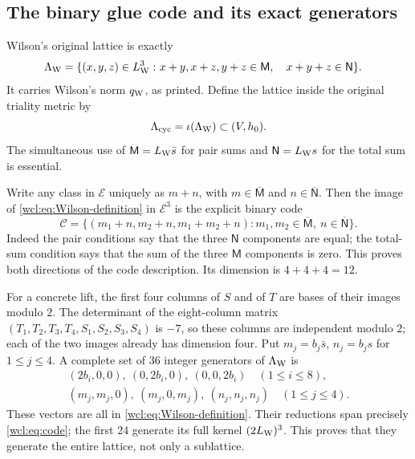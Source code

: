 \subsection{The binary glue code and its exact generators}

Wilson's original lattice is exactly
\begin{equation}
\begin{split}
 \Lambda_{\rm W}=\{(x,y,z)\in L_{\rm W}^3:\ &
 x+y,x+z,y+z\in\mathsf M,\quad x+y+z\in\mathsf N\}.
\end{split}
 \label{wcl:eq:Wilson-definition}
\end{equation}
It carries Wilson's norm $q_{\rm W}$, as printed. Define the lattice
inside the original triality metric by
\[
 \Lambda_{\rm cyc}=\iota(\Lambda_{\rm W})\subset(V,h_0).
\]
The simultaneous use of $\mathsf M=L_{\rm W}\bar s$ for pair sums
and $\mathsf N=L_{\rm W}s$ for the total sum is essential.

Write any class in $\mathcal E$ uniquely as $m+n$, with
$m\in\overline{\mathsf M}$ and $n\in\overline{\mathsf N}$.
Then the image of \eqref{wcl:eq:Wilson-definition} in $\mathcal E^3$
is the explicit binary code
\begin{equation}
 \mathcal C=
 \{(m_1+n,m_2+n,m_1+m_2+n):
       m_1,m_2\in\overline{\mathsf M},\
       n\in\overline{\mathsf N}\}.
 \label{wcl:eq:code}
\end{equation}
Indeed the pair conditions say that the three $\mathsf N$ components
are equal; the total-sum condition says that the sum of the three
$\mathsf M$ components is zero. This proves both directions of the
code description. Its dimension is $4+4+4=12$.

For a concrete lift, the first four columns of $S$ and of $T$ are
bases of their images modulo $2$. The determinant of the eight-column
matrix $(T_1,T_2,T_3,T_4,S_1,S_2,S_3,S_4)$ is $-7$, so these columns
are independent modulo $2$; each of the two images already has
dimension four. Put $m_j=b_j\bar s$, $n_j=b_js$ for $1\le j\le4$.
A complete set of $36$ integer generators of $\Lambda_{\rm W}$ is
\begin{equation}
\begin{gathered}
 (2b_i,0,0),\ (0,2b_i,0),\ (0,0,2b_i)\quad(1\le i\le8),\\
 (m_j,m_j,0),\ (m_j,0,m_j),\ (n_j,n_j,n_j)\quad(1\le j\le4).
\end{gathered}
 \label{wcl:eq:generators}
\end{equation}
These vectors are all in \eqref{wcl:eq:Wilson-definition}.
Their reductions span precisely \eqref{wcl:eq:code}; the first
$24$ generate its full kernel $(2L_{\rm W})^3$. This proves that
they generate the entire lattice, not only a sublattice.

